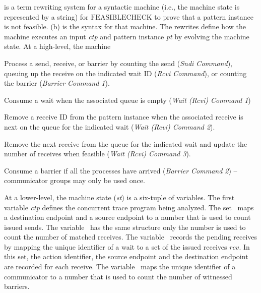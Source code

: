  is a term rewriting system for a syntactic
machine (i.e., the machine state is represented by a string) for
$\mathrm{FEASIBLECHECK}$ to prove that a pattern instance is not
feasible. (b) is the syntax for that machine. The
rewrites define how the machine executes an input \emph{ctp} and
pattern instance \emph{pt} by evolving the machine state. At a high-level, the machine
\begin{compactitem}
\item Process a send, receive, or barrier by counting the send (\emph{Sndi Command}), queuing up the receive on the indicated wait ID (\emph{Rcvi Command}), or counting the barrier (\emph{Barrier Command 1}).
\item Consume a wait when the associated queue is empty (\emph{Wait (Rcvi) Command 1})
\item Remove a receive ID from the pattern instance when the associated receive is next on the queue for the indicated wait (\emph{Wait (Rcvi) Command 2}).
\item Remove the next receive from the queue for the indicated wait and update the number of receives when feasible (\emph{Wait (Rcvi) Command 3}).
\item Consume a barrier if all the processes have arrived (\emph{Barrier Command 2}) -- communicator groups may only be used once.
\end{compactitem}
At a lower-level, the machine state (\textit{st}) is a six-tuple of variables. The first variable \textit{ctp} defines the concurrent trace program being analyzed. The set \epsnd\ maps a destination endpoint and a source endpoint to a number that is used to count issued sends. The variable \eprcv\ has the same structure only the number is used to count the number of matched receives. The variable \epwait\ records the pending receives by mapping the unique identifier of a wait to a set of the issued receives $\mathit{rcv}$. 
In this set, the action identifier, the source endpoint and the destination endpoint are recorded for each receive. The variable \epbarrier\ maps the unique identifier of a communicator to a number that is used to count the number of witnessed barriers.

